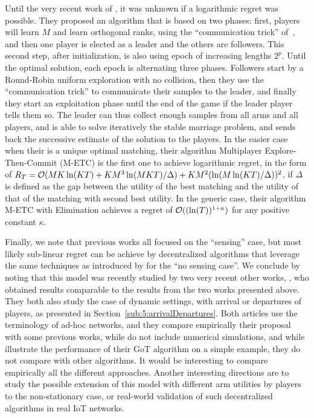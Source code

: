 Until the very recent work of \cite{KaufmannAbbas19}, it was unknown if a logarithmic regret was possible.
They proposed an algorithm that is based on two phases: first, players will learn $M$ and learn orthogonal ranks, using the ``communication trick'' of~\cite{BoursierPerchet18}, and then one player is elected as a leader and the others are followers.
This second step, after initialization, is also using epoch of increasing lengths $2^p$.
Until the optimal solution, each epoch is alternating three phases.
Followers start by a Round-Robin uniform exploration with no collision, then they use the ``communication trick'' to communicate their samples to the leader, and finally they start an exploitation phase until the end of the game if the leader player tells them so.
The leader can thus collect enough samples from all arms and all players, and is able to solve iteratively the stable marriage problem, and sends back the successive estimate of the solution to the players.
%
In the easier case when their is a unique optimal matching, their algorithm Multiplayer Explore-Then-Commit (M-ETC) is the first one to achieve logarithmic regret, in the form of $R_T = \mathcal{O}(M K \ln(K T) + K M^3 \ln(M K T) / \Delta) + K M^2 (\ln(M \ln(K T) / \Delta))^2$, if $\Delta$ is defined as the gap between the utility of the best matching and the utility of that of the matching with second best utility.
In the generic case, their algorithm M-ETC with Elimination achieves a regret of $\mathcal{O}((\ln(T))^{1+\kappa})$ for any positive constant $\kappa$.


Finally, we note that previous works all focused on the ``sensing'' case, but most likely sub-linear regret can be achieve by decentralized algorithms that leverage the same techniques as introduced by \cite{BoursierPerchet18,LugosiMehrabian18} for the ``no sensing case''.
%
We conclude by noting that this model was recently studied by two very recent other works, \cite{DarakHanawal18,Tibrewal2019}, who obtained results comparable to the results from the two works presented above.
They both also study the case of dynamic settings, with arrival or departures of players, as presented in Section~\ref{sub:5:arrivalDepartures}.
Both articles \cite{DarakHanawal18,Tibrewal2019} use the terminology of ad-hoc networks, and they compare empirically their proposal with some previous works, while \cite{KaufmannAbbas19} do not include numerical simulations, and while \cite{Bistritz18} illustrate the performance of their GoT algorithm on a simple example, they do not compare with other algorithms.
%
It would be interesting to compare empirically all the different approaches.
Another interesting directions are to study the possible extension of this model with different arm utilities by players to the non-stationary case, or real-world validation of such decentralized algorithms in real IoT networks.

